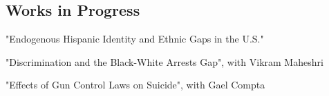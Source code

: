 \documentclass[10pt,letterpaper]{article}
\renewenvironment{itemize}{
  \begin{list}{}{
    \setlength{\leftmargin}{1.5em}
  }
}{
  \end{list}
}
\begin{document}
\subsection*{Works in Progress}
%
\begin{itemize}

\item "Endogenous Hispanic Identity and Ethnic Gaps in the U.S."
\item "Discrimination and the Black-White Arrests Gap", with Vikram Maheshri
\item "Effects of Gun Control Laws on Suicide", with Gael Compta

%


\end{itemize}
\end{document}
